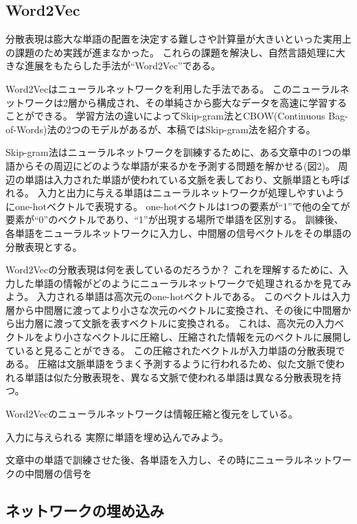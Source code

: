 \documentclass[J]{scitrans}
\begin{document}
\subsection{Word2Vec}

分散表現は膨大な単語の配置を決定する難しさや計算量が大きいといった実用上の課題のため実践が進まなかった。
これらの課題を解決し、自然言語処理に大きな進展をもたらした手法が``Word2Vec''である。

Word2Vecはニューラルネットワークを利用した手法である。
このニューラルネットワークは2層から構成され、その単純さから膨大なデータを高速に学習することができる。
学習方法の違いによってSkip-gram法とCBOW(Continuous Bag-of-Words)法の2つのモデルがあるが、本稿ではSkip-gram法を紹介する。

Skip-gram法はニューラルネットワークを訓練するために、ある文章中の1つの単語からその周辺にどのような単語が来るかを予測する問題を解かせる(図2)。
周辺の単語は入力された単語が使われている文脈を表しており、文脈単語とも呼ばれる。
入力と出力に与える単語はニューラルネットワークが処理しやすいようにone-hotベクトルで表現する。
one-hotベクトルは1つの要素が``1''で他の全てが要素が``0''のベクトルであり、``1''が出現する場所で単語を区別する。
訓練後、各単語をニューラルネットワークに入力し、中間層の信号ベクトルをその単語の分散表現とする。

Word2Vecの分散表現は何を表しているのだろうか？
これを理解するために、入力した単語の情報がどのようにニューラルネットワークで処理されるかを見てみよう。
入力される単語は高次元のone-hotベクトルである。
このベクトルは入力層から中間層に渡ってより小さな次元のベクトルに変換され、その後に中間層から出力層に渡って文脈を表すベクトルに変換される。
これは、高次元の入力ベクトルをより小さなベクトルに圧縮し、圧縮された情報を元のベクトルに展開していると見ることができる。
この圧縮されたベクトルが入力単語の分散表現である。
圧縮は文脈単語をうまく予測するように行われるため、似た文脈で使われる単語は似た分散表現を、異なる文脈で使われる単語は異なる分散表現を持つ。



Word2Vecのニューラルネットワークは情報圧縮と復元をしている。


入力に与えられる
実際に単語を埋め込んでみよう。

文章中の単語で訓練させた後、各単語を入力し、その時にニューラルネットワークの中間層の信号を

\subsection{ネットワークの埋め込み}
\end{document}

